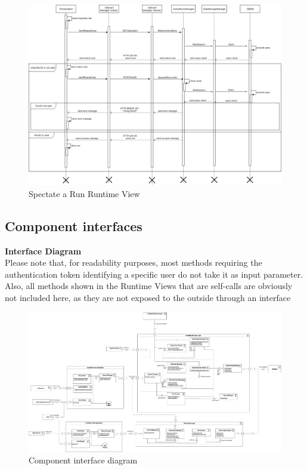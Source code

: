 \documentclass[titlepage]{article}
\begin{document}
\begin{figure}[H]
	\center
  	\includegraphics[width=15cm]{Spectate.png}
  	\caption{Spectate a Run Runtime View}
 	\label{fig:SPEC}
\end{figure}

\pagebreak



\subsection{Component interfaces}

{\bf Interface Diagram }\\ 
Please note that, for readability purposes, most methods requiring the authentication token identifying a specific user do not take it as input parameter.
Also, all methods shown in the Runtime Views that are self-calls are obviously not included here, as they are not exposed to the outside through an interface

\begin{figure}[H]
	\center
  	\includegraphics[width=15cm]{ComponentInterfaces.png}
  	\caption{Component interface diagram}
 	\label{fig:INT}
\end{figure}
\end{document}
